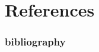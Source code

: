 \documentclass[xcolor={dvipsnames,svgnames}]{beamer}
\begin{document}
\section{References}
\frametitle{bibliography}
\printbibliography[heading=bibintoc]
\end{document}
